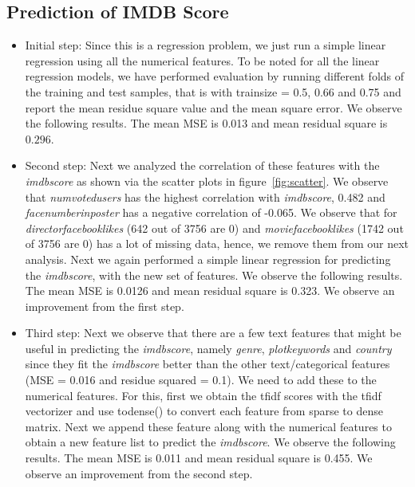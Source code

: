 \documentclass{article}%
\begin{document}
\subsection{Prediction of IMDB Score}
\begin{itemize}
\item Initial step: Since this is a regression problem, we just run a simple linear regression using all the numerical features. To be noted for all the linear regression models, we have performed evaluation by running different folds of the training and test samples, that is with trainsize = 0.5, 0.66 and 0.75 and report the mean residue square value and the mean square error. We observe the following results. The mean MSE is 0.013 and mean residual square is $0.296$.
\end{itemize}

\begin{itemize}
\item Second step: Next we analyzed the correlation of these features with the \textit{imdbscore} as shown via the scatter plots in figure~\ref{fig:scatter}. We observe that \textit{numvotedusers} has the highest correlation with \textit{imdbscore}, 0.482 and \textit{facenumberinposter} has a negative correlation of -0.065. We observe that for \textit{directorfacebooklikes} (642 out of 3756 are 0) and \textit{moviefacebooklikes} (1742 out of 3756 are 0) has a lot of missing data, hence, we remove them from our next analysis. Next we again performed a simple linear regression for predicting the \textit{imdbscore}, with the new set of features. We observe the following results. The mean MSE is 0.0126 and mean residual square is 0.323. We observe an improvement from the first step.
\end{itemize}

\begin{itemize}
\item Third step: Next we observe that there are a few text features that might be useful in predicting the \textit{imdbscore}, namely \textit{genre}, \textit{plotkeywords} and \textit{country} since they fit the \textit{imdbscore} better than the other text/categorical features (MSE = 0.016 and residue squared = 0.1). We need to add these to the numerical features. For this, first we obtain the tfidf scores with the tfidf vectorizer and use todense() to convert each feature from sparse to dense matrix. Next we append these feature along with the numerical features to obtain a new feature list to predict the \textit{imdbscore}. We observe the following results. The mean MSE is 0.011 and mean residual square is 0.455. We observe an improvement from the second step.
\end{itemize}
\end{document}
